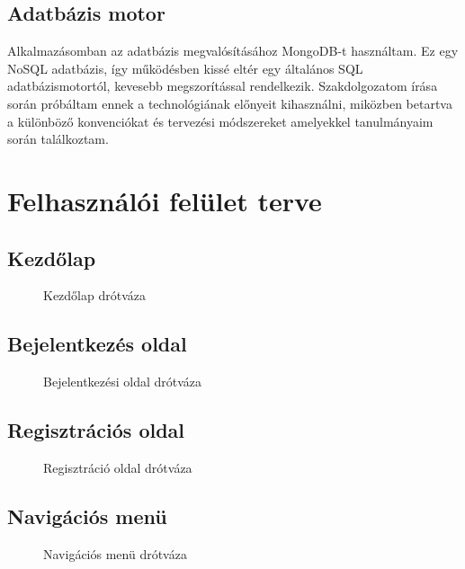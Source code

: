 \subsection{Adatbázis motor}

Alkalmazásomban az adatbázis megvalósításához MongoDB-t \cite{mongodb} használtam. Ez egy NoSQL adatbázis, így működésben kissé eltér egy általános SQL adatbázismotortól, kevesebb megszorítással rendelkezik. Szakdolgozatom írása során próbáltam ennek a technológiának előnyeit kihasználni, miközben betartva a különböző konvenciókat és tervezési módszereket amelyekkel tanulmányaim során találkoztam. 


\section{Felhasználói felület terve}

\subsection{Kezdőlap}
\begin{figure}[H]
	\centering
{}	\caption{Kezdőlap drótváza}
	\label{fig:homepage}
\end{figure}

\subsection{Bejelentkezés oldal}
\begin{figure}[H]
	\centering
{}	\caption{Bejelentkezési oldal drótváza}
	\label{fig:loginscreen}
\end{figure}

\subsection{Regisztrációs oldal}
\begin{figure}[H]
	\centering
{}	\caption{Regisztráció oldal drótváza}
	\label{fig:signupscreen}
\end{figure}

\subsection{Navigációs menü}
\begin{figure}[H]
	\centering
{}	\caption{Navigációs menü drótváza}
	\label{fig:menu}
\end{figure}

